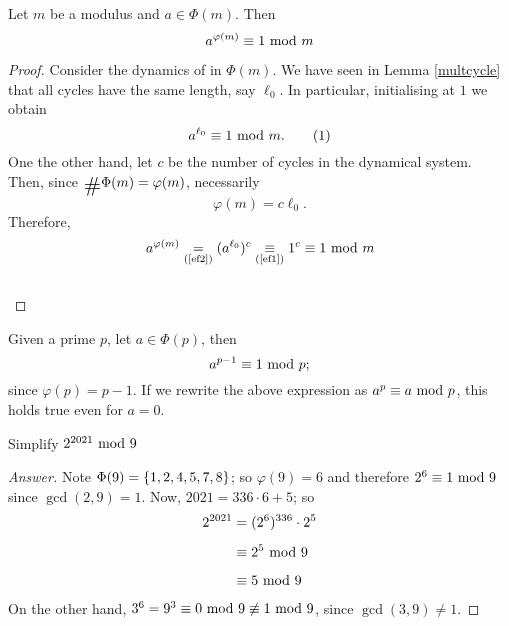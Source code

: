 \vspace*{1em}

\begin{theorem}\label{euler-fermat}
Let $m$ be a modulus and $a \in \Phi(m)$. Then
\[a^{\varphi(m)} \equiv 1\text{ mod }{m}\]
\end{theorem}
\begin{proof}
Consider the dynamics of  in $\Phi(m)$. We have seen in Lemma \ref{multcycle} that all cycles have the same length, say $\ell_0$. In particular, initialising at $1$ we obtain
\[a^{\ell_0} \equiv 1\text{ mod }{m}.\label{ef1}\tag{1}\]
One the other hand, let $c$ be the number of cycles in the dynamical system. Then, since $\card\Phi(m) = \varphi(m)$, necessarily
\[\varphi(m) = c\ell_0.\label{ef2}\tag{2}\]
Therefore, 
\[a^{\varphi(m)} \underset{\refp{ef2}}{=} (a^{\ell_0})^c \underset{\refp{ef1}}{\equiv} 1^c \equiv 1\modar{m}\]\\[-2em]
\end{proof}

\vspace*{1em}

\begin{corollary}\label{fermatlittle}
Given a prime $p$, let $a\in \Phi(p)$, then
\[a^{p-1} \equiv 1\text{ mod }{p};\]
since $\varphi(p) = p-1$. If we rewrite the above expression as $a^p \equiv a\text{ mod }{p}$, this holds true even for $a = 0$.
\end{corollary}

\vspace*{1em}

\begin{example}
Simplify $2^{2021}\text{ mod }{9}$
\end{example}
\begin{proof}[Answer]
Note $\Phi(9) = \left\{1,2,4,5,7,8\right\}$; so $\varphi(9) = 6$ and therefore $2^6 \equiv 1\text{ mod }{9}$ since $\gcd(2,9) = 1$. Now, $2021 = 336\cdot 6 + 5$; so
\begin{align*}
2^{2021} &= (2^6)^{336}\cdot 2^5\\[0.5em]
&\equiv 2^5\text{ mod }{9}\\[0.5em]
&\equiv 5\text{ mod }{9}
\end{align*}
On the other hand, $3^6 = 9^3 \equiv 0\text{ mod }{9} \not\equiv 1\text{ mod }{9}$, since $\gcd(3,9) \neq 1$.
\end{proof}

\vspace*{1em}

